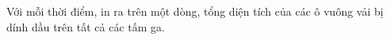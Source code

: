Với mỗi thời điểm, in ra trên một dòng, tổng diện tích của các ô vuông vải bị dính dầu trên tất cả các tấm ga.